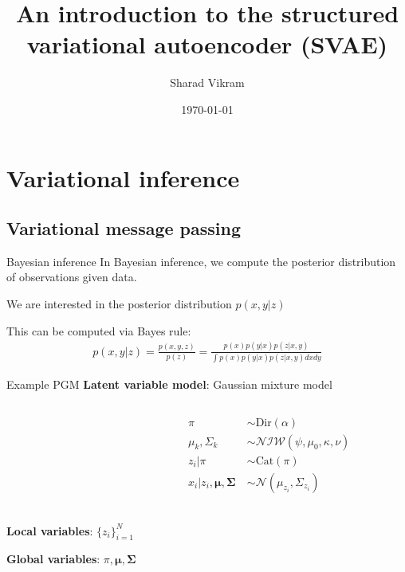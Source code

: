 \documentclass[10pt, compress]{beamer}
\title{An introduction to the structured variational autoencoder (SVAE)}
\subtitle{}
\date{\today}
\author{Sharad Vikram}
\institute{UCSD}
\begin{document}
\begin{frame}
  \titlepage
\end{frame}

\section{Variational inference}

\subsection{Variational message passing}

\begin{frame}{Bayesian inference}
  In Bayesian inference, we compute the posterior
  distribution of observations given data.

  \pause

    \begin{center}
      
    \end{center}
  \pause
  We are interested in the posterior distribution $p(x, y | z)$

  \pause
  This can be computed via Bayes rule:
  \begin{align*}
    p(x, y | z) = \frac{p(x, y, z)}{p(z)} = \frac{p(x)p(y | x)p(z | x, y)}{\int p(x)p(y | x)p(z | x, y)dx dy}
  \end{align*}
\end{frame}

\begin{frame}{Example PGM}
  \textbf{Latent variable model}: Gaussian mixture model
  \begin{columns}
    \begin{column}{0.5\textwidth}
      \begin{center}
        
      \end{center}
    \end{column}
    \begin{column}{0.5\textwidth}
      \begin{align*}
        \pi &\sim \textrm{Dir}(\alpha) \\
        \mu_k, \Sigma_k &\sim \mathcal{NIW}(\psi, \mu_0, \kappa, \nu) \\
        z_i | \pi &\sim \textrm{Cat}(\pi) \\
        x_i | z_i, \bm{\mu}, \bm{\Sigma} \ &\sim \mathcal{N}(\mu_{z_i}, \Sigma_{z_i}) \\
      \end{align*}
    \end{column}
  \end{columns}

  \pause
  \textbf{Local variables}: $\{z_i\}_{i=1}^N$

  \pause
  \textbf{Global variables}: $\pi, \bm{\mu}, \bm{\Sigma}$
\end{frame}
\end{document}
